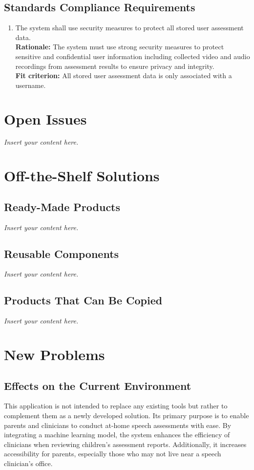 \documentclass[12pt]{article}
\newcommand{\lips}{\textit{Insert your content here.}}
\begin{document}
\subsection{Standards Compliance Requirements}
\begin{enumerate}[{CR-STD}1. ]
  \item The system shall use security measures to protect all stored user assessment data.\\
  \textbf{Rationale: }The system must use strong security measures to protect sensitive and confidential user information including collected video and audio recordings from assessment results to ensure privacy and integrity.\\
  \textbf{Fit criterion: }All stored user assessment data is only associated with a username. 

\end{enumerate}

\section{Open Issues}
\lips

\section{Off-the-Shelf Solutions}
\subsection{Ready-Made Products}
\lips
\subsection{Reusable Components}
\lips
\subsection{Products That Can Be Copied}
\lips

\section{New Problems}
\subsection{Effects on the Current Environment}
\hspace{2em}This application is not intended to replace any existing tools but rather to complement 
them as a newly developed solution. Its primary purpose is to enable parents and clinicians to 
conduct at-home speech assessments with ease. By integrating a machine learning model, the system 
enhances the efficiency of clinicians when reviewing children's assessment reports. 
Additionally, it increases accessibility for parents, especially those who may not live near a speech clinician's office.
\end{document}
